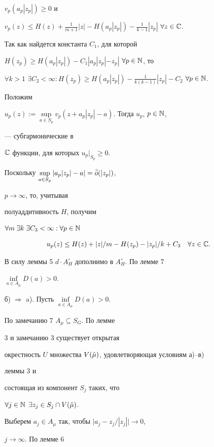 \begin{pf}
$v_p(a_p|z_p|)\ge 0$ и 


$v_p(z)\le H(z)+\frac{1}{m+1}|z|-H(a_p|z_p|)- 


\frac{1}{k-1}|z_p|$ $\forall z\in\Bbb C$. 


Так как найдется константа $C_1$, для которой 


$H(z_p)\ge H(a_p|z_p|)-C_1|a_p|z_p|-z_p|$ $\forall p\in\Bbb N$, то 


$\forall k>1$ $\exists C_2<\infty :H(z_p)\ge H(a_p|z_p|)- 


\frac{1}{k(k-1)}|z_p|-C_2$ $\forall p\in\Bbb N$. 


Положим 


$u_p(z):=\sup\limits_{a\in S_p}v_p(z+a_p|z_p|-a)$. Тогда $u_p$, $p\in\Bbb N$,


--- субгармонические в 


$\Bbb C$ функции, для которых $u_p\vert_{S_p}\ge 0$. 


Поскольку $\sup\limits_{a\in S_p}|a_p|z_p|-a|=\Bar{\Bar o}(|z_p|)$, 


$p\to \infty$, то, учитывая 


полуаддитивность $H$, получим 


$\forall m\;\exists k\;\exists C_3<\infty :\forall p\in\Bbb N$ 


$$ 


u_p(z)\le H(z)+|z|/m-H(z_p)-|z_p|/k+C_3\quad \forall z\in\Bbb C. 


$$ 


В силу леммы 5 $d\cdot A^\circ_H$ дополнимо в $A^\circ_H$. По лемме 7 


$\inf\limits_{a\in A_\mu}D(a)>0$. 


 


б) $\Rightarrow$ a). Пусть $\inf\limits_{a\in A_\mu}D(a)>0$. 


По замечанию 7 $A_\mu\subseteq S_G$. По лемме 


3 и замечанию 3 существует открытая 


окрестность $U$ множества $V(\Hat\mu)$, удовлетворяющая условиям а)--в) 


леммы 3 и 


состоящая из компонент $S_j$ таких, что 


$\forall j\in\Bbb N$ $\exists z_j\in S_j\cap V(\Hat\mu)$. 


Выберем $a_j\in A_\mu$ так, чтобы $\bigl|a_j-z_j/|z_j|\bigr|\to 0$, 


$j\to \infty$. По лемме 6 



\end{pf}
